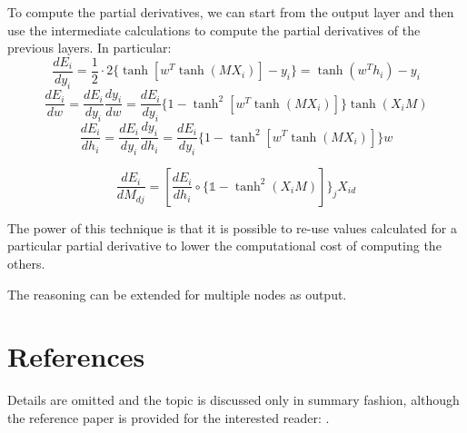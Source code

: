 To compute the partial derivatives, we can start from the output layer and then use the intermediate calculations to compute
the partial derivatives of the previous layers.
In particular:
\[ \frac{dE_i}{dy_i} = \frac{1}{2} \cdot 2 \{ \tanh[w^T \tanh(M X_i)] - y_i\} = \tanh(w^T h_i) - y_i \]
\[ \frac{dE_i}{dw} = \frac{dE_i}{dy_i} \frac{dy_i}{dw} = \frac{dE_i}{dy_i} \{1 - \tanh^2[w^T \tanh(M X_i)]\} \tanh(X_i M) \]
\[ \frac{dE_i}{dh_i} = \frac{dE_i}{dy_i} \frac{dy_i}{dh_i} = \frac{dE_i}{dy_i} \{1 - \tanh^2[w^T \tanh(M X_i)]\} w \]

\[ \frac{dE_i}{dM_{dj}} = [\frac{dE_i}{dh_i} \circ \{\mathbb{1} - \tanh^2(X_i M)]\}_j X_{id} \]

The power of this technique is that it is possible to re-use values calculated for a particular partial derivative to lower the computational cost of computing the others.

The reasoning can be extended for multiple nodes as output.

\section{References}
Details are omitted and the topic is discussed only in summary fashion, although the reference paper is provided for the interested reader: \cite{DBLP:journals/corr/Rong14}.